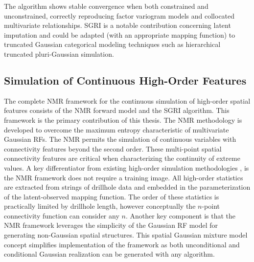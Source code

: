 The algorithm shows stable convergence when both constrained and unconstrained, correctly reproducing factor variogram models and collocated multivariate relationships. \Gls{SGRI} is a notable contribution concerning latent imputation and could be adapted (with an appropriate mapping function) to truncated Gaussian categorical modeling techniques such as hierarchical truncated pluri-Gaussian simulation.

\subsection{Simulation of Continuous High-Order Features}
\label{subsec:07hosim}

The complete \gls{NMR} framework for the continuous simulation of high-order spatial features consists of the \gls{NMR} forward model and the \gls{SGRI} algorithm. This framework is the primary contribution of this thesis. The \gls{NMR} methodology is developed to overcome the maximum entropy characteristic of multivariate Gaussian \glspl{RF}. The \gls{NMR} permits the simulation of continuous variables with connectivity features beyond the second order. These multi-point spatial connectivity features are critical when characterizing the continuity of extreme values. A key differentiator from existing high-order simulation methodologies \citep{mustapha2011hosim}, is the \gls{NMR} framework does not require a training image. All high-order statistics are extracted from strings of drillhole data and embedded in the parameterization of the latent-observed mapping function. The order of these statistics is practically limited by drillhole length, however conceptually the $n$-point connectivity function can consider any $n$. Another key component is that the \gls{NMR} framework leverages the simplicity of the Gaussian \gls{RF} model for generating non-Gaussian spatial structures. This spatial Gaussian mixture model concept simplifies implementation of the framework as both unconditional and conditional Gaussian realization can be generated with any algorithm.

